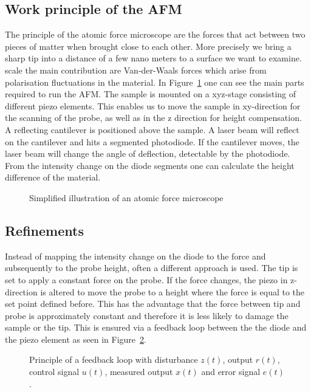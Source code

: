 \documentclass[paper=a4,fontsize=10pt,DIV=18,twocolumn,parskip=half]{scrartcl}
\numberwithin{equation}{section}    %
\newcommand{\figref}[1]{Figure~\ref{fig:#1}}
\begin{document}
\subsection{Work principle of the AFM}
The principle of the atomic force microscope are the forces that act between two 
pieces of matter when brought close to each other. More precisely we bring a 
sharp tip into a distance of a few nano meters to  a surface we want to examine.  
scale the main contribution are Van-der-Waals forces which arise from 
polarisation fluctuations in the material.
In \figref{afm_scheme} one can see the main parts required to run the AFM. 
The sample is mounted on a xyz-stage consisting of different piezo elements. 
This enables us to move the sample in xy-direction for the scanning of the 
probe, as well as in the z direction for height compensation. A reflecting 
cantilever is positioned above the sample. A laser beam will reflect on the 
cantilever and hits a segmented photodiode. If the cantilever moves, the 
laser beam will change the angle of deflection, detectable by the photodiode.
From the intensity change on the diode segments one can calculate the height 
difference of the material.

\begin{figure}
    \centering
    \caption{Simplified illustration of an atomic force microscope}
    \label{fig:afm_scheme}
\end{figure}

\subsection{Refinements}
Instead of mapping the intensity change on the diode to the force and 
subsequently to the probe height, often a different approach is used. The tip is 
set to apply a constant force on the probe. If the force changes, the piezo in 
z-direction is altered to move the probe to a height where the force is equal to 
the set point defined before. This has the advantage that the force between tip 
and probe is approximately constant and therefore it is less likely to damage 
the sample or the tip. This is ensured via a feedback loop between the the diode 
and the piezo element as seen in \figref{control_loop}.

\begin{figure}
    \centering
    \caption{Principle of a feedback loop with disturbance $z(t)$, output 
        $r(t)$, control signal $u(t)$, measured output $x(t)$ and error signal 
        $e(t)$.}
    \label{fig:control_loop}
\end{figure}
\end{document}
